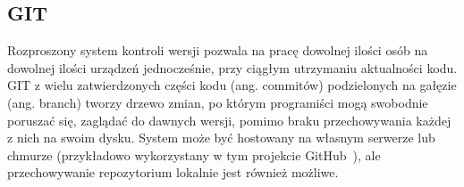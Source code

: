 \subsection{GIT}
Rozproszony system kontroli wersji pozwala na pracę dowolnej ilości osób na dowolnej ilości urządzeń jednocześnie, 
przy ciągłym utrzymaniu aktualności kodu.
GIT z wielu zatwierdzonych części kodu (ang. commitów) podzielonych na gałęzie (ang. branch) tworzy drzewo zmian, 
po którym programiści mogą swobodnie 
poruszać się, zaglądać do dawnych wersji, pomimo braku przechowywania każdej z nich na swoim dysku.
System może być hostowany na własnym serwerze lub chmurze (przykładowo wykorzystany w tym projekcie 
GitHub~\cite{github,Halaczkiewicz_Navigator_GitHub}), 
ale przechowywanie repozytorium lokalnie jest również możliwe.